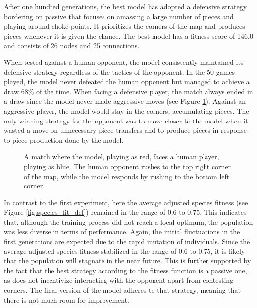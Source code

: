 \documentclass[letterpaper, 12pt]{article}
\begin{document}
After one hundred generations, the best model has adopted a defensive strategy bordering
on passive that focuses on amassing a large number of pieces and playing around choke
points. It prioritizes the corners of the map and produces pieces whenever it is given
the chance. The best model has a fitness score of 146.0 and consists of 26 nodes and 25
connections.

When tested against a human opponent, the model consistently maintained its defensive
strategy regardless of the tactics of the opponent. In the 50 games played, the model
never defeated the human opponent but managed to achieve a draw 68\% of the time. When
facing a defensive player, the match always ended in a draw since the model never made
aggressive moves (see Figure \ref{fig:player_def}). Against an aggressive player, the
model would stay in the corners, accumulating pieces. The only winning strategy for the
opponent was to move closer to the model when it wasted a move on unnecessary piece
transfers and to produce pieces in response to piece production done by the model.

\begin{figure}[H]
  \centering
  \caption{A match where the
    model, playing as red, faces a human player, playing as blue. The human opponent rushes
    to the top right corner of the map, while the model responds by rushing to the bottom
    left corner.
  }
  \label{fig:player_def}
\end{figure}

In contrast to the first experiment, here the average adjusted species fitness (see
Figure \ref{fig:species_fit_def}) remained in the range of 0.6 to 0.75. This indicates
that, although the training process did not reach a local optimum, the population was
less diverse in terms of performance. Again, the initial fluctuations in the first
generations are expected due to the rapid mutation of individuals. Since the average
adjusted species fitness stabilized in the range of 0.6 to 0.75, it is likely that the
population will stagnate in the near future. This is further supported by the fact that
the best strategy according to the fitness function is a passive one, as does not
incentivize interacting with the opponent apart from contesting corners. The final
version of the model adheres to that strategy, meaning that there is not much room for
improvement.
\end{document}
